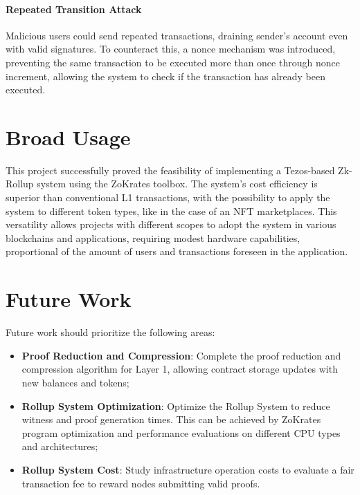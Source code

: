 \paragraph{Repeated Transition Attack} Malicious users could send repeated transactions, draining sender's account even with valid signatures. To counteract this, a nonce mechanism was introduced, preventing the same transaction to be executed more than once through nonce increment, allowing the system to check if the transaction has already been executed.

\section{Broad Usage\label{sec:dissemination}}

This project successfully proved the feasibility of implementing a Tezos-based Zk-Rollup system using the ZoKrates toolbox. The system's cost efficiency is superior than conventional L1 transactions, with the possibility to apply the system to different token types, like in the case of an NFT marketplaces. This versatility allows projects with different scopes to adopt the system in various blockchains and applications, requiring modest hardware capabilities, proportional of the amount of users and transactions foreseen in the application.

\section{Future Work}

Future work should prioritize the following areas:
\vspace{-0.11in}
\begin{itemize}
	\item \textbf{Proof Reduction and Compression}: Complete the proof reduction and compression algorithm for Layer 1, allowing contract storage updates with new balances and tokens;
	      \vspace{-0.11in}
	\item \textbf{Rollup System Optimization}: Optimize the Rollup System to reduce witness and proof generation times. This can be achieved by ZoKrates program optimization and performance evaluations on different CPU types and architectures;
	      \vspace{-0.11in}
	\item \textbf{Rollup System Cost}: Study infrastructure operation costs to evaluate a fair transaction fee to reward nodes submitting valid proofs.
	      \vspace{-0.11in}
\end{itemize}




